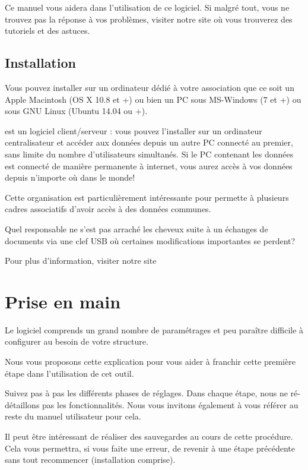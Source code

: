 \documentclass[a4paper,10pt,oneside,french]{sphinxmanual}
\begin{document}
Ce manuel vous aidera dans l’utilisation de ce logiciel.
Si malgré tout, vous ne trouvez pas la réponse à vos problèmes, visiter notre site  où vous trouverez des tutoriels et des astuces.


\subsection{Installation}
\label{\detokenize{asso/presentation:installation}}
Vous pouvez installer  sur un ordinateur dédié à votre association que ce soit un Apple Macintosh (OS X 10.8 et +) ou bien un PC sous MS-Windows (7 et +) ou sous GNU Linux (Ubuntu 14.04 ou +).

 est un logiciel client/serveur : vous pouvez l’installer sur un ordinateur centralisateur et accéder aux données depuis un autre PC connecté au premier, sans limite du nombre d’utilisateurs simultanés.
Si le PC contenant les données est connecté de manière permanente à internet, vous aurez accès à vos données depuis n’importe où dans le monde!

Cette organisation est particulièrement intéressante pour permette à plusieurs cadres associatifs d’avoir accès à des données communes.

Quel responsable ne s’est pas arraché les cheveux suite à un échanges de documents via une clef USB où certaines modifications importantes se perdent?

Pour plus d’information, visiter notre site 


\section{Prise en main}
\label{\detokenize{asso/first_step::doc}}\label{\detokenize{asso/first_step:prise-en-main}}
Le logiciel  comprends un grand nombre de paramétrages et peu paraître difficile à configurer au besoin de votre structure.

Nous vous proposons cette explication pour vous aider à franchir cette première étape dans l’utilisation de cet outil.

Suivez pas à pas les différents phases de réglages. Dans chaque étape, nous ne ré-détaillons pas les fonctionnalités.
Nous vous invitons également à vous référer au reste du manuel utilisateur pour cela.

Il peut être intéressant de réaliser des sauvegardes au cours de cette procédure.
Cela vous permettra, si vous faite une erreur, de revenir à une étape précédente sans tout recommencer (installation comprise).
\end{document}
